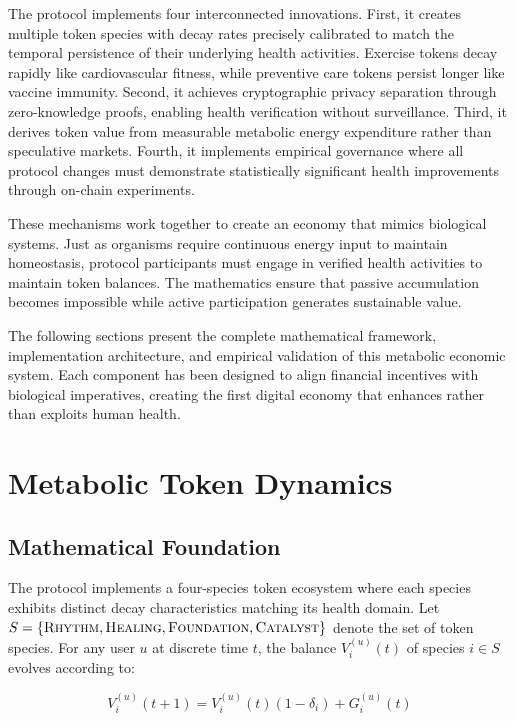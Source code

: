 \documentclass[11pt,letterpaper]{article}
\newcommand{\tokenname}[1]{\textsc{#1}}
\begin{document}
The protocol implements four interconnected innovations. First, it creates multiple token species with decay rates precisely calibrated to match the temporal persistence of their underlying health activities. Exercise tokens decay rapidly like cardiovascular fitness, while preventive care tokens persist longer like vaccine immunity. Second, it achieves cryptographic privacy separation through zero-knowledge proofs, enabling health verification without surveillance. Third, it derives token value from measurable metabolic energy expenditure rather than speculative markets. Fourth, it implements empirical governance where all protocol changes must demonstrate statistically significant health improvements through on-chain experiments.

These mechanisms work together to create an economy that mimics biological systems. Just as organisms require continuous energy input to maintain homeostasis, protocol participants must engage in verified health activities to maintain token balances. The mathematics ensure that passive accumulation becomes impossible while active participation generates sustainable value.

The following sections present the complete mathematical framework, implementation architecture, and empirical validation of this metabolic economic system. Each component has been designed to align financial incentives with biological imperatives, creating the first digital economy that enhances rather than exploits human health.

\section{Metabolic Token Dynamics}

\subsection{Mathematical Foundation}

The protocol implements a four-species token ecosystem where each species exhibits distinct decay characteristics matching its health domain. Let $S = \{\tokenname{Rhythm}, \tokenname{Healing}, \tokenname{Foundation}, \tokenname{Catalyst}\}$ denote the set of token species. For any user $u$ at discrete time $t$, the balance $V_i^{(u)}(t)$ of species $i \in S$ evolves according to:

\begin{equation}
V_i^{(u)}(t+1) = V_i^{(u)}(t)(1 - \delta_i) + G_i^{(u)}(t)
\end{equation}
\end{document}
